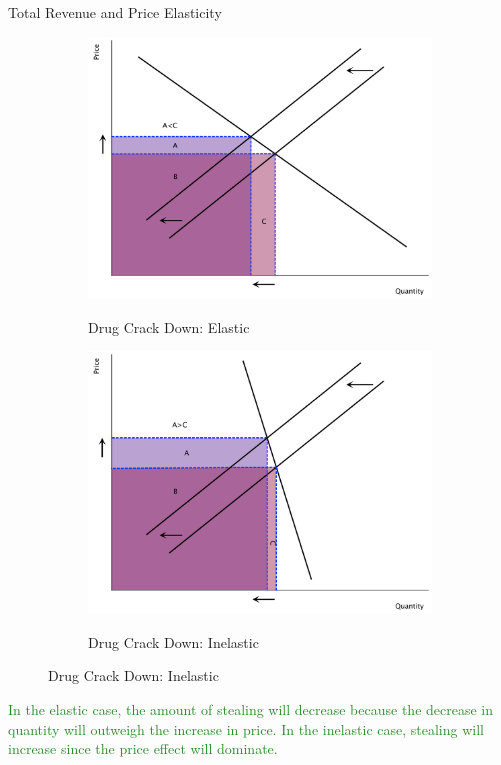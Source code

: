 \documentclass[xcolor={dvipsnames},pdf, hyperref={colorlinks=true, citecolor=ForestGreen, linkcolor=BlueViolet, urlcolor=Magenta}]{beamer}
\newcommand{\ddp}[1]{{\textcolor{ForestGreen}{#1}}}
\begin{document}
\begin{frame}[b]{Total Revenue and Price Elasticity}
		\begin{figure}[H]
			\centering
			\begin{subfigure}{.5\textwidth}
				\ddp{\includegraphics[scale=.25]{plot31.pdf}}
				\caption{Drug Crack Down: Elastic}
			\end{subfigure}%
			\begin{subfigure}{.5\textwidth}
				\centering
				\ddp{\includegraphics[scale=.25]{plot32.pdf}}
				\caption{Drug Crack Down: Inelastic}
			\end{subfigure}
		\end{figure}
		
		\ddp{In the elastic case, the amount of stealing will decrease because the decrease in quantity will outweigh the increase in price. In the inelastic case, stealing will increase since the price effect will dominate.}
\end{frame}
\end{document}
